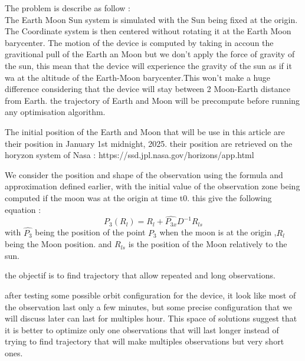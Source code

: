 \documentclass[11pt]{article} %
\begin{document}
		The problem is describe as follow :
		\\
		The Earth Moon Sun system is simulated with the Sun being fixed at the origin. The Coordinate system is then centered without rotating it at the Earth Moon barycenter. The motion of the device is computed by taking in accoun the gravitional pull of the Earth an Moon but we don't apply the force of gravity of the sun, this mean that the device will experience the gravity of the sun as if it wa at the altitude of the Earth-Moon barycenter.This won't make a huge difference considering that the device will stay between 2 Moon-Earth distance from Earth. the trajectory of Earth and Moon will be precompute before running any optimisation algorithm.
		
		The initial position of the Earth and Moon that will be use in this article are their position in January 1st midnight, 2025. their position are retrieved on the horyzon system of Nasa : https://ssd.jpl.nasa.gov/horizons/app.html
		
		
		
		We consider the position and shape of the observation using the formula and approximation defined earlier, with the initial value of the observation zone being computed if the moon was at the origin at time t0.
		this give the following equation :
		$$
		P_3(R_l)=R_{l}+\hat{P_{3x}}D^{-1}R_{ls}
		$$
		with $\hat{P_3}$ being the position of the point $P_3$ when the moon is at the origin
		,$R_{l}$ being the Moon position.
		and $R_{ls}$ is the position of the Moon relatively to the sun.
		
		the objectif is to find trajectory that allow repeated and long observations.
		
		
		after testing some possible orbit configuration for the device, it look like most of the observation last only a few minutes, but some precise configuration that we will discuss later can last for multiples hour. This space of solutions suggest that it is better to optimize only one observations that will last longer instead of trying to find trajectory that will make multiples observations but very short ones.
		
\end{document}
